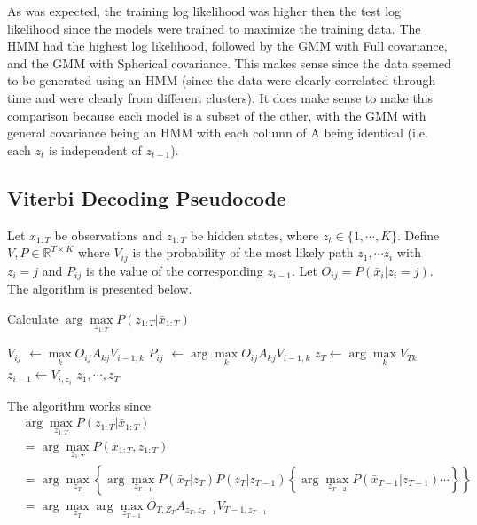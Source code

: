\documentclass[paper=a4, fontsize=11pt]{scrartcl} %
\numberwithin{equation}{section} %
\numberwithin{figure}{section} %
\numberwithin{table}{section} %
\begin{document}
As was expected, the training log likelihood was higher then the test log likelihood since the models were trained to maximize the training data. The HMM had the highest log likelihood, followed by the GMM with Full covariance, and the GMM with Spherical covariance. This makes sense since the data seemed to be generated using an HMM (since the data were clearly correlated through time and were clearly from different clusters). It does make sense to make this comparison because each model is a subset of the other, with the GMM with general covariance being an HMM with each column of A being identical (i.e. each $z_t$ is independent of $z_{t-1}$).

\subsection{Viterbi Decoding Pseudocode}

Let $x_{1:T}$ be observations and $z_{1:T}$ be hidden states, where $z_t \in \{1,\cdots, K\}$. Define $V,P \in \mathbb{R}^{T \times K}$ where $V_{ij}$ is the probability of the most likely path $z_1, \cdots z_i$ with $z_i=j$ and $P_{ij}$ is the value of the corresponding $z_{i-1}$. Let $O_{ij}=P(\bar{x}_i|z_i=j)$. The algorithm is presented below.

\begin{algorithm} %
	\caption{Calculate $\arg\max\limits_{z_{1:T}}P(z_{1:T} | \bar{x}_{1:T})$} %
	\label{alg1} %
	\begin{algorithmic}[1] %
		 
		\EndFor
		\State $V_{ij}$ $\leftarrow \max\limits_{k} O_{ij}A_{kj}V_{i-1,k}$
		\State $P_{ij}$ $\leftarrow \arg\max\limits_{k}O_{ij}A_{kj} V_{i-1,k}$ 
		\EndFor
		\EndFor
		\State $ z_T \leftarrow \arg\max\limits_{k} V_{Tk}$
		\State $ z_{i-1} \leftarrow V_{i, z_{i}}$
		\EndFor
		\Return $z_1, \cdots, z_T$
	\end{algorithmic}
\end{algorithm}

The algorithm works since 
\begin{align}
&\arg\max\limits_{z_{1:T}}P(z_{1:T} | \bar{x}_{1:T}) \\ &=\arg\max\limits_{z_{1:T}}P(\bar{x}_{1:T},z_{1:T}) \\
&= \arg\max\limits_{z_{T}}\left\{\arg\max\limits_{z_{T-1}}P(\bar{x}_T|z_T)P(z_T|z_{T-1})\left\{\arg\max\limits_{z_{T-2}} P(\bar{x}_{T-1}|z_{T-1}) \cdots \right\}\right\}\\
&=\arg\max\limits_{z_T}\arg\max\limits_{z_{T-1}}O_{T,Z_{T}}A_{z_{T},z_{T-1}}V_{T-1,z_{T-1}}
\end{align}
\end{document}
